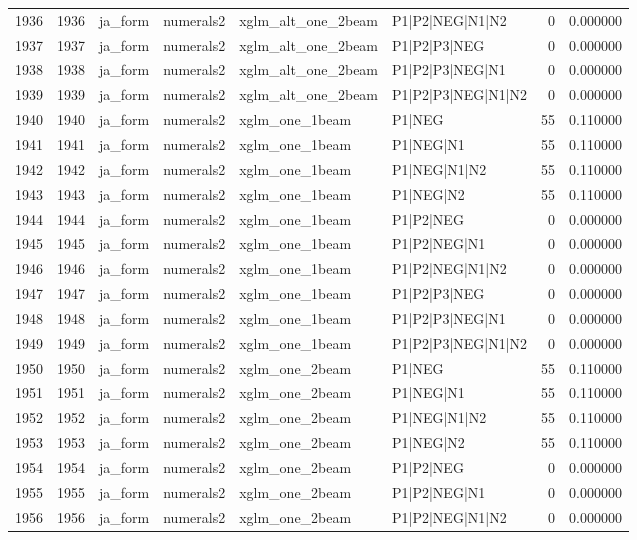 \begin{tabular}{lrllllrr}
1936 & 1936 & ja_form & numerals2 & xglm_alt_one_2beam & P1|P2|NEG|N1|N2 & 0 & 0.000000 \\
1937 & 1937 & ja_form & numerals2 & xglm_alt_one_2beam & P1|P2|P3|NEG & 0 & 0.000000 \\
1938 & 1938 & ja_form & numerals2 & xglm_alt_one_2beam & P1|P2|P3|NEG|N1 & 0 & 0.000000 \\
1939 & 1939 & ja_form & numerals2 & xglm_alt_one_2beam & P1|P2|P3|NEG|N1|N2 & 0 & 0.000000 \\
1940 & 1940 & ja_form & numerals2 & xglm_one_1beam & P1|NEG & 55 & 0.110000 \\
1941 & 1941 & ja_form & numerals2 & xglm_one_1beam & P1|NEG|N1 & 55 & 0.110000 \\
1942 & 1942 & ja_form & numerals2 & xglm_one_1beam & P1|NEG|N1|N2 & 55 & 0.110000 \\
1943 & 1943 & ja_form & numerals2 & xglm_one_1beam & P1|NEG|N2 & 55 & 0.110000 \\
1944 & 1944 & ja_form & numerals2 & xglm_one_1beam & P1|P2|NEG & 0 & 0.000000 \\
1945 & 1945 & ja_form & numerals2 & xglm_one_1beam & P1|P2|NEG|N1 & 0 & 0.000000 \\
1946 & 1946 & ja_form & numerals2 & xglm_one_1beam & P1|P2|NEG|N1|N2 & 0 & 0.000000 \\
1947 & 1947 & ja_form & numerals2 & xglm_one_1beam & P1|P2|P3|NEG & 0 & 0.000000 \\
1948 & 1948 & ja_form & numerals2 & xglm_one_1beam & P1|P2|P3|NEG|N1 & 0 & 0.000000 \\
1949 & 1949 & ja_form & numerals2 & xglm_one_1beam & P1|P2|P3|NEG|N1|N2 & 0 & 0.000000 \\
1950 & 1950 & ja_form & numerals2 & xglm_one_2beam & P1|NEG & 55 & 0.110000 \\
1951 & 1951 & ja_form & numerals2 & xglm_one_2beam & P1|NEG|N1 & 55 & 0.110000 \\
1952 & 1952 & ja_form & numerals2 & xglm_one_2beam & P1|NEG|N1|N2 & 55 & 0.110000 \\
1953 & 1953 & ja_form & numerals2 & xglm_one_2beam & P1|NEG|N2 & 55 & 0.110000 \\
1954 & 1954 & ja_form & numerals2 & xglm_one_2beam & P1|P2|NEG & 0 & 0.000000 \\
1955 & 1955 & ja_form & numerals2 & xglm_one_2beam & P1|P2|NEG|N1 & 0 & 0.000000 \\
1956 & 1956 & ja_form & numerals2 & xglm_one_2beam & P1|P2|NEG|N1|N2 & 0 & 0.000000 \\

\end{tabular}
